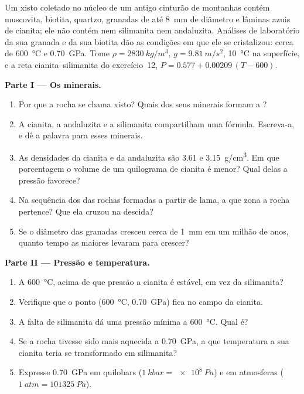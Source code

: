 \begin{problem}
\label{pb:g12:metamorphic-rocks:1}
Um xisto coletado no núcleo de um antigo cinturão de montanhas contém
muscovita, biotita, quartzo, granadas de até \qty{8}{mm} de diâmetro e
lâminas azuis de cianita; ele não contém nem silimanita nem andaluzita.
Análises de laboratório da sua granada e da sua biotita dão as condições em
que ele se cristalizou: cerca de \qty{600}{\celsius} e \qty{0.70}{GPa}. Tome
$\rho =
\qty{2830}{kg/m^3}$, $g = \qty{9.81}{m/s^2}$, \qty{10}{\celsius} na
superfície, e a reta cianita--silimanita do exercício~12, $P = 0.577 +
0.00209\,(T - 600)$.

\medskip
\noindent\textbf{Parte I --- Os minerais.}
\begin{enumerate}
  \item Por que a rocha se chama xisto? Quais dos seus minerais formam a
        ?
  \item A cianita, a andaluzita e a silimanita compartilham uma fórmula.
        Escreva-a, e dê a palavra para esses minerais.
  \item As densidades da cianita e da andaluzita são \num{3.61} e
        \qty{3.15}{g/cm^3}. Em que porcentagem o volume de um quilograma de
        cianita é menor? Qual delas a pressão favorece?
  \item Na sequência dos  das rochas formadas a partir de
        lama, a que zona a rocha pertence? Que  ela cruzou na
        descida?
  \item Se o diâmetro das granadas cresceu cerca de \qty{1}{mm} em um milhão
        de anos, quanto tempo as maiores levaram para crescer?
\end{enumerate}

\medskip
\noindent\textbf{Parte II --- Pressão e temperatura.}
\begin{enumerate}[resume]
  \item A \qty{600}{\celsius}, acima de que pressão a cianita é estável, em
        vez da silimanita?
  \item Verifique que o ponto (\qty{600}{\celsius}, \qty{0.70}{GPa}) fica no
        campo da cianita.
  \item A falta de silimanita dá uma pressão mínima a \qty{600}{\celsius}.
        Qual é?
  \item Se a rocha tivesse sido mais aquecida a \qty{0.70}{GPa}, a que
        temperatura a sua cianita teria se transformado em silimanita?
  \item Expresse \qty{0.70}{GPa} em quilobars ($\qty{1}{kbar} =
        \qty{e8}{Pa}$) e em atmosferas ($\qty{1}{atm} = \qty{101325}{Pa}$).
\end{enumerate}


\end{problem}

